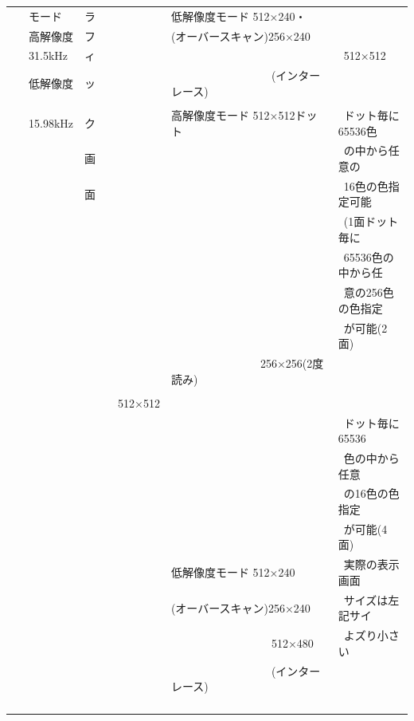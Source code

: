 ﻿\documentclass[twoside,a4paper,12pt]{article}
\begin{document}
\begin{tabular}{|p{13mm}|p{23mm}|p{4mm}|p{20mm}|p{65mm}|p{36mm}|}
& \ モード & ラ & & 低解像度モード 512×240・ &\\[2mm]
& \ 高解像度 & フ & & (オーバースキャン)256×240 &\\[2mm]
& \ 31.5kHz & ィ & & & \ 512×512\\[2mm]
& \ 低解像度 & ッ & & \ \ \ \ \ \ \ \ \ \ \ \ \ \ \ \ \ \ (インターレース) &\\
\cline{5-6}
& & & & &\\[-4mm]
& \ 15.98kHz & ク & & 高解像度モード 512×512ドット & \ ドット毎に65536色\\
& & 画 & & & \ の中から任意の\\
& & 面 & & & \ 16色の色指定可能\\
& & & & & \ (1面ドット毎に\\
& & & & & \ 65536色の中から任\\
& & & & & \ 意の256色の色指定\\
& & & & & \ が可能(2面)\\
& & & & \ \ \ \ \ \ \ \ \ \ \ \ \ \ \ \ 256×256(2度読み) &\\
& & & & &\\
& & & \ \ 512×512 & &\\
& & & & & \ ドット毎に65536\\
& & & & & \ 色の中から任意\\
& & & & & \ の16色の色指定\\
& & & & & \ が可能(4面)\\
& & & & 低解像度モード 512×240	& \ 実際の表示画面\\
& & & & (オーバースキャン)256×240 & \ サイズは左記サイ\\
& & & & \ \ \ \ \ \ \ \ \ \ \ \ \ \ \ \ \ \ 512×480 & \ よズり小さい\\
& & & & \ \ \ \ \ \ \ \ \ \ \ \ \ \ \ \ \ \ (インターレース) &\\
& & & & &\\
& & & & &\\
& & & & &\\
& & & & &\\
\hline
\end{tabular}

\newpage
\end{document}
